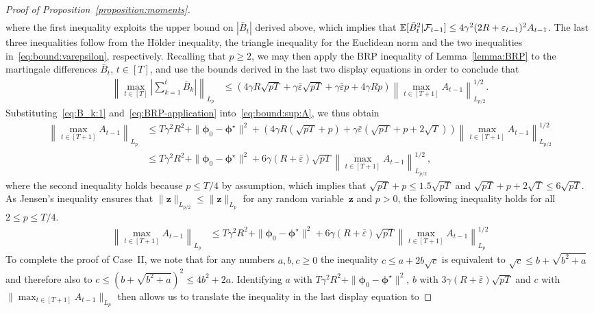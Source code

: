 \documentclass[11pt, a4paper, oneside, reqno]{article}
\begin{document}
\begin{proof}[Proof of Proposition~\ref{proposition:moments}]
\begin{align*}
		\end{align*}
		where the first inequality exploits the upper bound on $|\bar B_t|$ derived above, which implies that
		$\mathbb{E}[ \bar B_t ^2 | \mathcal F_{t-1}] \leq 4 \gamma^2 (2R + \varepsilon_{t-1})^2 A_{t-1}$. The last three inequalities follow from the H\"{o}lder inequality, the triangle inequality for the Euclidean norm and the two inequalities in~\eqref{eq:bound:varepsilon}, respectively. Recalling that $p \geq 2$, we may then apply the BRP inequality of Lemma~\ref{lemma:BRP} to the martingale differences $\bar B_t$, $t\in[T]$, and use the bounds derived in the last two display equations in order to conclude that
		\begin{align}
		\label{eq:BRP-application}
		    \left\| \max_{t \in [T]} \left| \sum_{k=1}^t \bar B_k \right| \right\|_{L_p}
		    &\leq \left( 4 \gamma R \sqrt{pT} + \gamma \bar \varepsilon \sqrt{pT} + \gamma \bar \varepsilon p + 4 \gamma R p \right) \left\| \max_{t \in [T+1]} A_{t-1} \right\|_{L_{p/2}}^{1/2}.
		\end{align}
		Substituting~\eqref{eq:B_k:1} and~\eqref{eq:BRP-application} into~\eqref{eq:bound:sup:A}, we thus obtain 
		\begin{align*}
		\left\| \max_{t \in [T+1]} A_{t-1} \right\|_{L_p} 
		&\leq T \gamma^2 R^2 + \| \bm \phi_0 - \bm \phi^\star \|^2 + \left( 4 \gamma R \left( \sqrt{pT} + p \right) + \gamma \bar \varepsilon \left( \sqrt{pT} + p +2 \sqrt{T} \right) \right) \left\| \max_{t \in [T+1]} A_{t-1} \right\|_{L_{p/2}}^{1/2} \\
		&\leq T \gamma^2 R^2 + \| \bm \phi_0 - \bm \phi^\star \|^2 + 6 \gamma \left( R + \bar \varepsilon \right) \sqrt{pT} \left\| \max_{t \in [T+1]} A_{t-1} \right\|_{L_{p/2}}^{1/2},
		\end{align*}
		where the second inequality holds because $p \leq T/4$ by assumption, which implies that $\sqrt{pT} + p \leq 1.5 \sqrt{pT} $ and $ \sqrt{pT} + p + 2 \sqrt{T} \leq 6 \sqrt{pT}$. As Jensen's inequality ensures that $\| \bm z \|_{L_{p/2}} \leq \| \bm z \|_{L_p}$ for any random variable~$\bm z$ and $p > 0$, the following inequality holds for all $2 \leq p \leq T/4$.
		\begin{align*}
		\left\| \max_{t \in [T+1]} A_{t-1} \right\|_{L_p} 
		&\leq T \gamma^2 R^2 + \| \bm \phi_0 - \bm \phi^\star \|^2 + 6 \gamma \left( R + \bar \varepsilon \right) \sqrt{pT} \left\| \max_{t \in [T+1]} A_{t-1} \right\|_{L_p}^{1/2}
		\end{align*}
		To complete the proof of Case~II, we note that for any numbers $a, b, c \geq 0$ the inequality $c \leq a + 2b \sqrt{c} $ is equivalent to $\sqrt{c} \leq b + \sqrt{b^2+a}$ and therefore also to $c \leq (b + \sqrt{b^2+a})^2 \leq 4b^2 + 2a$. Identifying $a$ with $T \gamma^2 R^2 + \| \bm \phi_0 - \bm \phi^\star \|^2$, $b$ with $3\gamma \left( R + \bar \varepsilon \right) \sqrt{pT}$ and $c$ with $\| \max_{t \in [T+1]} A_{t-1}\|_{L_p}$ then allows us to translate the inequality in the last display equation to

\end{proof}
\end{document}
